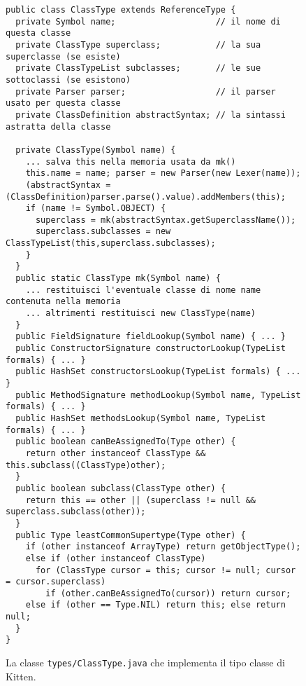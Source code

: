\begin{figure}[t]
{\scriptsize
\begin{verbatim}
public class ClassType extends ReferenceType {
  private Symbol name;                    // il nome di questa classe
  private ClassType superclass;           // la sua superclasse (se esiste)
  private ClassTypeList subclasses;       // le sue sottoclassi (se esistono)
  private Parser parser;                  // il parser usato per questa classe
  private ClassDefinition abstractSyntax; // la sintassi astratta della classe

  private ClassType(Symbol name) {
    ... salva this nella memoria usata da mk()
    this.name = name; parser = new Parser(new Lexer(name));
    (abstractSyntax = (ClassDefinition)parser.parse().value).addMembers(this);
    if (name != Symbol.OBJECT) {
      superclass = mk(abstractSyntax.getSuperclassName());
      superclass.subclasses = new ClassTypeList(this,superclass.subclasses);
    }
  }
  public static ClassType mk(Symbol name) {
    ... restituisci l'eventuale classe di nome name contenuta nella memoria
    ... altrimenti restituisci new ClassType(name)
  }
  public FieldSignature fieldLookup(Symbol name) { ... }
  public ConstructorSignature constructorLookup(TypeList formals) { ... }
  public HashSet constructorsLookup(TypeList formals) { ... }
  public MethodSignature methodLookup(Symbol name, TypeList formals) { ... }
  public HashSet methodsLookup(Symbol name, TypeList formals) { ... }
  public boolean canBeAssignedTo(Type other) {
    return other instanceof ClassType && this.subclass((ClassType)other);
  }
  public boolean subclass(ClassType other) {
    return this == other || (superclass != null && superclass.subclass(other));
  }
  public Type leastCommonSupertype(Type other) {
    if (other instanceof ArrayType) return getObjectType();
    else if (other instanceof ClassType)
      for (ClassType cursor = this; cursor != null; cursor = cursor.superclass)
        if (other.canBeAssignedTo(cursor)) return cursor;
    else if (other == Type.NIL) return this; else return null;
  }
}
\end{verbatim}
}
\caption{La classe \texttt{types/ClassType.java} che implementa il tipo classe di Kitten.}
  \label{fig:types.ClassType}
\end{figure}

